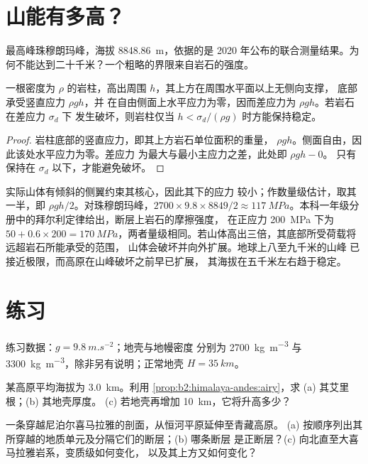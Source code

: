 \section{山能有多高？}\label{sec:b2:himalaya-andes:heights}

最高峰珠穆朗玛峰，海拔 \qty{8848.86}{m}，依据的是
2020 年公布的联合测量结果。为何不能达到二十千米？一个粗略的界限来自岩石的强度。

\begin{proposition}[岩石强度给出的高度限制]\label{prop:b2:himalaya-andes:height}
一根密度为 $\rho$ 的岩柱，高出周围 $h$，其上方在周围水平面以上无侧向支撑，
底部承受竖直应力 $\rho g h$，并
在自由侧面上水平应力为零，因而差应力为 $\rho g h$。若岩石在差应力 $\sigma_d$ 下
发生破坏，则岩柱仅当 $h < \sigma_d/(\rho
g)$ 时方能保持稳定。
\end{proposition}

\begin{proof}
岩柱底部的竖直应力，即其上方岩石单位面积的重量，
$\rho g h$。侧面自由，因此该处水平应力为零。差应力
为最大与最小主应力之差，此处即 $\rho g h - 0$。
只有保持在 $\sigma_d$ 以下，才能避免破坏。
\end{proof}

实际山体有倾斜的侧翼约束其核心，因此其下的应力
较小；作数量级估计，取其一半，即 $\rho g h/2$。对珠穆朗玛峰，$2700 \times 9.8
\times 8849/2 \approx \qty{117}{MPa}$。本科一年级分册中的拜尔利定律给出，断层上岩石的摩擦强度，
在正应力 \qty{200}{MPa} 下为 $50 + 0.6 \times 200 =
\qty{170}{MPa}$，两者量级相同。若山体高出三倍，其底部所受荷载将远超岩石所能承受的范围，
山体会破坏并向外扩展。地球上八至九千米的山峰
已接近极限，而高原在山峰破坏之前早已扩展，
其海拔在五千米左右趋于稳定。

\section*{练习}\label{sec:b2:himalaya-andes:exercises}

练习数据：$g = \qty{9.8}{m.s^{-2}}$；地壳与地幔密度
分别为 \qty{2700}{kg.m^{-3}} 与 \qty{3300}{kg.m^{-3}}，除非另有说明；正常地壳 $H =
\qty{35}{km}$。

\begin{exercise}[$\star$]\label{exo:b2:himalaya-andes:1}
某高原平均海拔为 \qty{3.0}{km}。利用
\cref{prop:b2:himalaya-andes:airy}，求 (a) 其艾里根；(b) 其地壳厚度。
(c) 若地壳再增加 \qty{10}{km}，它将升高多少？
\end{exercise}

\begin{exercise}[$\star$]\label{exo:b2:himalaya-andes:2}
一条穿越尼泊尔喜马拉雅的剖面，从恒河平原延伸至青藏高原。
(a) 按顺序列出其所穿越的地质单元及分隔它们的断层；(b) 哪条断层
是正断层？(c) 向北直至大喜马拉雅岩系，变质级如何变化，
以及其上方又如何变化？
\end{exercise}

